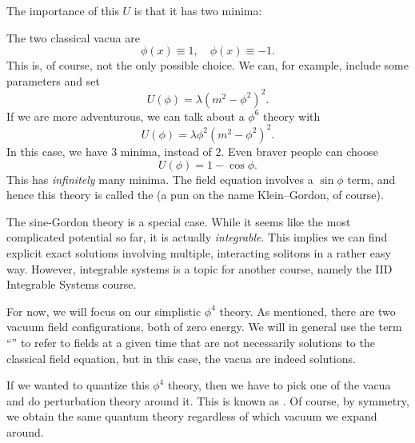 \documentclass[a4paper]{article}
\begin{document}
The importance of this $U$ is that it has two minima:
\begin{center}
\end{center}
The two classical vacua are
\[
  \phi(x) \equiv 1,\quad \phi(x) \equiv -1.
\]
This is, of course, not the only possible choice. We can, for example, include some parameters and set
\[
  U(\phi) = \lambda(m^2 - \phi^2)^2.
\]
If we are more adventurous, we can talk about a $\phi^6$ theory with
\[
  U(\phi) = \lambda \phi^2 (m^2 - \phi^2)^2.
\]
In this case, we have $3$ minima, instead of $2$. Even braver people can choose
\[
  U(\phi) = 1 - \cos \phi.
\]
This has \emph{infinitely} many minima. The field equation involves a $\sin \phi$ term, and hence this theory is called the  (a pun on the name Klein--Gordon, of course).

The sine-Gordon theory is a special case. While it seems like the most complicated potential so far, it is actually \emph{integrable}. This implies we can find explicit exact solutions involving multiple, interacting solitons in a rather easy way. However, integrable systems is a topic for another course, namely the IID Integrable Systems course.

For now, we will focus on our simplistic $\phi^4$ theory. As mentioned, there are two vacuum field configurations, both of zero energy. We will in general use the term ``'' to refer to fields at a given time that are not necessarily solutions to the classical field equation, but in this case, the vacua are indeed solutions.

If we wanted to quantize this $\phi^4$ theory, then we have to pick one of the vacua and do perturbation theory around it. This is known as . Of course, by symmetry, we obtain the same quantum theory regardless of which vacuum we expand around.
\end{document}
